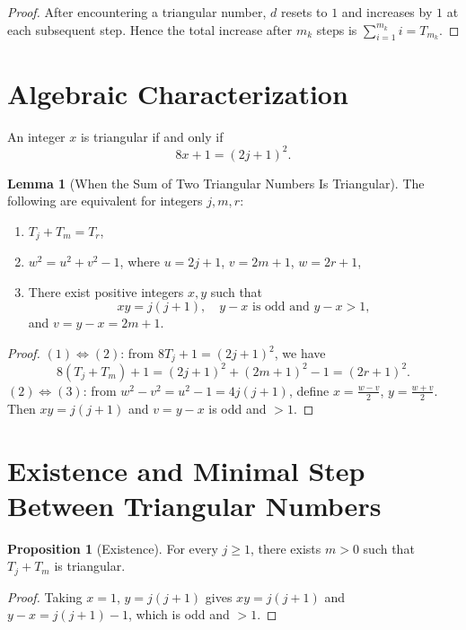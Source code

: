 \documentclass[12pt]{article}
\theoremstyle{definition}
\newtheorem{lemma}[definition]{Lemma}
\newtheorem{proposition}[definition]{Proposition}
\begin{document}
\begin{proof}
    After encountering a triangular number, $d$ resets to $1$ and increases by $1$ at each subsequent step.
    Hence the total increase after $m_k$ steps is $\sum_{i=1}^{m_k} i = T_{m_k}$.
\end{proof}

\section{Algebraic Characterization}
An integer $x$ is triangular if and only if
\[
    8x + 1 = (2j + 1)^2.
\]

\begin{lemma}[When the Sum of Two Triangular Numbers Is Triangular]
    The following are equivalent for integers $j,m,r$:
    \begin{enumerate}[label=(\arabic*)]
        \item $T_j + T_m = T_r$,
        \item $w^2 = u^2 + v^2 - 1$, where $u = 2j + 1$, $v = 2m + 1$, $w = 2r + 1$,
        \item There exist positive integers $x,y$ such that
              \[
                  xy = j(j+1), \quad y-x \text{ is odd and } y-x>1,
              \]
              and $v = y - x = 2m + 1$.
    \end{enumerate}
\end{lemma}

\begin{proof}
    $(1)\Leftrightarrow(2)$: from $8T_j + 1 = (2j+1)^2$, we have
    \[
        8(T_j + T_m) + 1 = (2j + 1)^2 + (2m + 1)^2 - 1 = (2r + 1)^2.
    \]
    $(2)\Leftrightarrow(3)$: from $w^2 - v^2 = u^2 - 1 = 4j(j+1)$,
    define $x = \frac{w - v}{2}$, $y = \frac{w + v}{2}$.
    Then $xy = j(j+1)$ and $v = y - x$ is odd and $>1$.
\end{proof}

\section{Existence and Minimal Step Between Triangular Numbers}

\begin{proposition}[Existence]
    For every $j\ge1$, there exists $m>0$ such that $T_j + T_m$ is triangular.
\end{proposition}

\begin{proof}
    Taking $x=1$, $y=j(j+1)$ gives $xy = j(j+1)$ and $y-x = j(j+1)-1$, which is odd and $>1$.
\end{proof}
\end{document}
